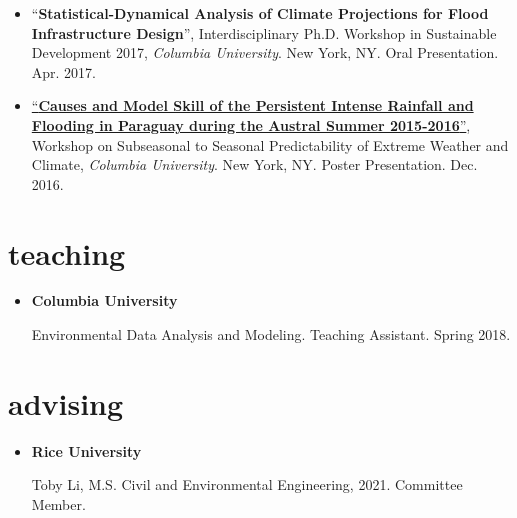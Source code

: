 \documentclass[10pt,oneside]{article}
\begin{document}
\begin{itemize}[label={}]
  \item \enquote{\textbf{Statistical-Dynamical Analysis of Climate Projections for Flood Infrastructure Design}}, Interdisciplinary Ph.D. Workshop in Sustainable Development 2017,  \textit{Columbia University}. New York, NY. Oral Presentation. Apr. 2017.

  \item \href{https://doi.org/10.13140/RG.2.2.20146.30406}{\enquote{\textbf{Causes and Model Skill of the Persistent Intense Rainfall and Flooding in Paraguay during the Austral Summer 2015-2016}}}, Workshop on Subseasonal to Seasonal Predictability of Extreme Weather and Climate,  \textit{Columbia University}. New York, NY. Poster Presentation. Dec. 2016.

\end{itemize}


\section{teaching}

\mbox{}\vspace{-\dimexpr\baselineskip\relax}


\begin{itemize}[label={}]

  \item \textbf{Columbia University}

        Environmental Data Analysis and Modeling. Teaching Assistant. Spring 2018.


\end{itemize}


\section{advising}

\mbox{}\vspace{-\dimexpr\baselineskip\relax}


\begin{itemize}[label={}]

  \item \textbf{Rice University}

        Toby Li, M.S. Civil and Environmental Engineering, 2021. Committee Member.


\end{itemize}

\end{document}

